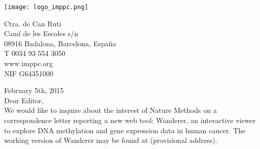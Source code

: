 \documentclass[a4paper,english]{article}
\begin{document}


\hfill
\noindent
\parbox{4.5cm}{

\texttt{[image: logo\_imppc.png]}
}
\begin{flushright}
\begin{small}
Ctra. de Can Ruti\\
Camí de les Escoles s/n\\
08916 Badalona, Barcelona, España\\
T 0034 93 554 3050\\
www.imppc.org\\
NIF G64351000\\
\end{small}
\end{flushright}


February 5th, 2015\\

Dear Editor,\\

We would like to inquire about the interest of Nature Methods  on a correspondence letter reporting a new web tool: Wanderer, an interactive viewer to explore DNA methylation and gene expression data in human cancer. The working version of Wanderer may be found at  (provisional address).\\
\end{document}
